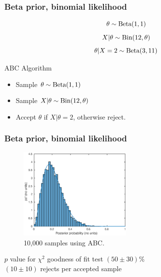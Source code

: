 \documentclass{beamer}
\begin{document}
\begin{frame}
\frametitle{Beta prior, binomial likelihood}
\begin{equation}
\theta\sim\textup{Beta}(1,1)
\end{equation}
\begin{equation}
X|\theta\sim\textup{Bin}(12,\theta)
\end{equation}
\begin{equation}
\theta|X=2\sim\textup{Beta}(3,11)
\end{equation}
\pause
\begin{block}{ABC Algorithm}
\begin{itemize}
  \item Sample $\theta\sim\textup{Beta}(1,1)$
  \item Sample $X|\theta\sim\textup{Bin}(12,\theta)$
  \item Accept $\theta$ if $X|\theta = 2$, otherwise reject.
\end{itemize}
\end{block}
\end{frame}

\begin{frame}
\frametitle{Beta prior, binomial likelihood}
\begin{figure}
\includegraphics[width=0.5\textwidth]{binomial_ABC0528.eps}
\caption{10,000 samples using ABC.}
\label{binomial}
\end{figure}
$p$ value for $\chi^2$ goodness of fit test $(50\pm30)\%$ \\
$(10\pm10)$ rejects per accepted sample
\end{frame}
\end{document}
